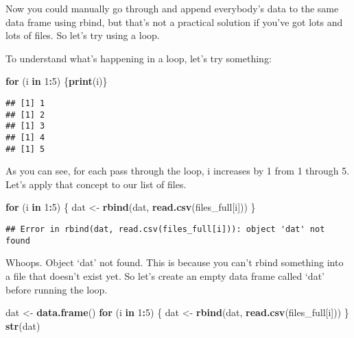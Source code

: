 \documentclass[
]{article}
\newenvironment{Shaded}{\begin{snugshade}}{\end{snugshade}}
\newcommand{\ControlFlowTok}[1]{\textcolor[rgb]{0.13,0.29,0.53}{\textbf{#1}}}
\newcommand{\DecValTok}[1]{\textcolor[rgb]{0.00,0.00,0.81}{#1}}
\newcommand{\KeywordTok}[1]{\textcolor[rgb]{0.13,0.29,0.53}{\textbf{#1}}}
\newcommand{\NormalTok}[1]{#1}
\newcommand{\OperatorTok}[1]{\textcolor[rgb]{0.81,0.36,0.00}{\textbf{#1}}}
\newcommand{\StringTok}[1]{\textcolor[rgb]{0.31,0.60,0.02}{#1}}
\begin{document}
Now you could manually go through and append everybody's data to the
same data frame using rbind, but that's not a practical solution if
you've got lots and lots of files. So let's try using a loop.

To understand what's happening in a loop, let's try something:

\begin{Shaded}
\begin{Highlighting}[]
\ControlFlowTok{for}\NormalTok{ (i }\ControlFlowTok{in} \DecValTok{1}\OperatorTok{:}\DecValTok{5}\NormalTok{) \{}\KeywordTok{print}\NormalTok{(i)\}}
\end{Highlighting}
\end{Shaded}

\begin{verbatim}
## [1] 1
## [1] 2
## [1] 3
## [1] 4
## [1] 5
\end{verbatim}

As you can see, for each pass through the loop, i increases by 1 from 1
through 5. Let's apply that concept to our list of files.

\begin{Shaded}
\begin{Highlighting}[]
\ControlFlowTok{for}\NormalTok{ (i }\ControlFlowTok{in} \DecValTok{1}\OperatorTok{:}\DecValTok{5}\NormalTok{) \{}
\NormalTok{        dat <-}\StringTok{ }\KeywordTok{rbind}\NormalTok{(dat, }\KeywordTok{read.csv}\NormalTok{(files_full[i]))}
\NormalTok{\}}
\end{Highlighting}
\end{Shaded}

\begin{verbatim}
## Error in rbind(dat, read.csv(files_full[i])): object 'dat' not found
\end{verbatim}

Whoops. Object `dat' not found. This is because you can't rbind
something into a file that doesn't exist yet. So let's create an empty
data frame called `dat' before running the loop.

\begin{Shaded}
\begin{Highlighting}[]
\NormalTok{dat <-}\StringTok{ }\KeywordTok{data.frame}\NormalTok{()}
\ControlFlowTok{for}\NormalTok{ (i }\ControlFlowTok{in} \DecValTok{1}\OperatorTok{:}\DecValTok{5}\NormalTok{) \{}
\NormalTok{        dat <-}\StringTok{ }\KeywordTok{rbind}\NormalTok{(dat, }\KeywordTok{read.csv}\NormalTok{(files_full[i]))}
\NormalTok{\}}
\KeywordTok{str}\NormalTok{(dat)}
\end{Highlighting}
\end{Shaded}
\end{document}
